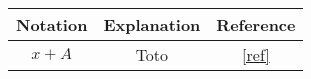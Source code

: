 
\newcommand{\notation}[3]{#1 & #2 & \eqref{#3}\\\hline}

\begin{center}
\begin{tabular}{|c|c|c|}\hline
	Notation & Explanation & Reference \\\hline\hline
	\notation{$x+A$}{Toto}{ref}
\end{tabular}
\end{center}